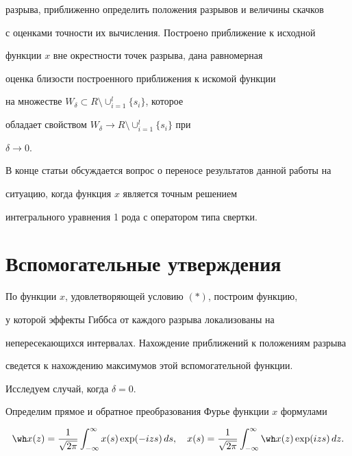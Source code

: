 разрыва, приближенно определить положения разрывов и величины скачков


с оценками точности их вычисления. Построено приближение к исходной


функции $x$ вне окрестности точек разрыва, дана равномерная


оценка близости построенного приближения к искомой функции


на множестве $W_\delta\subset R\setminus \cup_{i=1}^l \{s_i\}$, которое


обладает свойством $W_\delta\to R\setminus \cup_{i=1}^l \{s_i\}$ при


$\delta\to 0$.





В конце статьи обсуждается вопрос о переносе результатов данной работы на


ситуацию, когда функция $x$ является точным решением


интегрального уравнения 1 рода с оператором типа свертки.





\section{Вспомогательные утверждения}





По функции $x$, удовлетворяющей условию $(*)$, построим функцию,


у которой эффекты Гиббса от каждого разрыва локализованы на


непересекающихся интервалах. Нахождение приближений к положениям разрыва


сведется к нахождению максимумов этой вспомогательной функции.





Исследуем случай, когда $\delta =0$.


Определим прямое и обратное преобразования Фурье функции $x$ формулами


$$


\wh x(z)=\frac{1}{\sqrt{2\pi}}\int_{-\infty}^{\infty} x(s)\exp(-izs)


\,ds,\quad


x(s)=\frac{1}{\sqrt{2\pi}}\int_{-\infty}^{\infty} \wh x(z)


\exp(izs) \,dz.


$$


